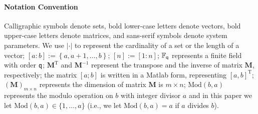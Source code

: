 \documentclass[conference,letterpaper]{IEEEtran}
\begin{document}
\paragraph*{Notation Convention}
Calligraphic symbols denote sets,  
bold lower-case letters denote vectors, bold upper-case letters denote matrices, and sans-serif symbols denote system parameters.
We use $|\cdot|$ to represent the cardinality of a set or the length of a vector;
$[a:b]:=\left\{ a,a+1,\ldots,b\right\}$; %
  $[n] := [1:n]$;
$\mathbb{F}_{{\sf q}}$ represents a  finite field with order ${\sf q}$;         
$\mathbf{M}^{\text{T}}$  and $\mathbf{M}^{-1}$ represent the transpose  and the inverse of matrix $\mathbf{M}$, respectively;
 the matrix $[a;b]$ is written in a Matlab form, representing $[a,b]^{\text{T}}$;
$(\mathbf{M})_{m \times n}$ represents the dimension of matrix $\mathbf{M}$ is $m \times n$;
 $\text{Mod} (b,a)$ represents the modulo operation on $b$ with  integer divisor $a$ and in this paper we let $\text{Mod}(b,a)\in \{1,\ldots,a \}$ (i.e., we let $ \text{Mod}(b,a)=a$ if $a$ divides $b$).
\end{document}
